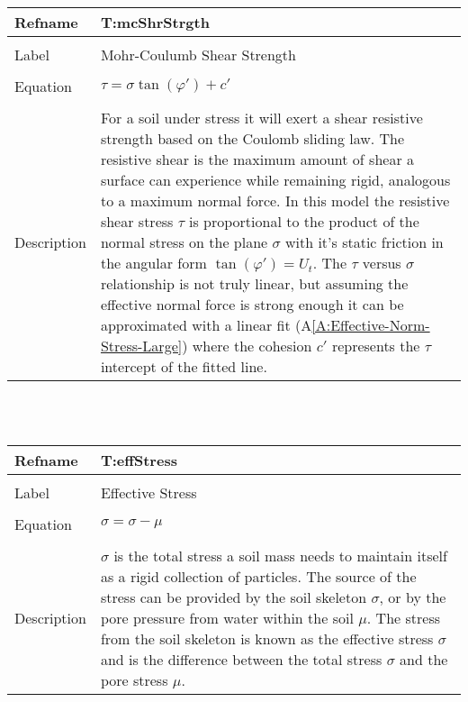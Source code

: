 \documentclass[12pt]{article}
\begin{document}
~\newline
\noindent \begin{minipage}{\textwidth}
\begin{tabular}{p{} p{}}
\toprule \textbf{Refname} & \textbf{T:mcShrStrgth}
\label{T:mcShrStrgth}
\\ \midrule \\
Label & Mohr-Coulumb Shear Strength
\\ \midrule \\
Equation & $τ=σ \tan\left(φ'\right)+c'$
\\ \midrule \\
Description & For a soil under stress it will exert a shear resistive strength based on the Coulomb sliding law. The resistive shear is the maximum amount of shear a surface can experience while remaining rigid, analogous to a maximum normal force. In this model the resistive shear stress $τ$ is proportional to the product of the normal stress on the plane $σ$ with it's static friction in the angular form $\tan\left(φ'\right)={U_{t}}$. The $τ$ versus $σ$ relationship is not truly linear, but assuming the effective normal force is strong enough it can be approximated with a linear fit (A\ref{A:Effective-Norm-Stress-Large}) where the cohesion $c'$ represents the $τ$ intercept of the fitted line.
\\ \bottomrule \end{tabular}
\end{minipage}\\
~\newline
\noindent \begin{minipage}{\textwidth}
\begin{tabular}{p{} p{}}
\toprule \textbf{Refname} & \textbf{T:effStress}
\label{T:effStress}
\\ \midrule \\
Label & Effective Stress
\\ \midrule \\
Equation & $σ=σ-μ$
\\ \midrule \\
Description & $σ$ is the total stress a soil mass needs to maintain itself as a rigid collection of particles. The source of the stress can be provided by the soil skeleton $σ$, or by the pore pressure from water within the soil $μ$. The stress from the soil skeleton is known as the effective stress $σ$ and is the difference between the total stress $σ$ and the pore stress $μ$.
\\ \bottomrule \end{tabular}
\end{minipage}\\
\end{document}
